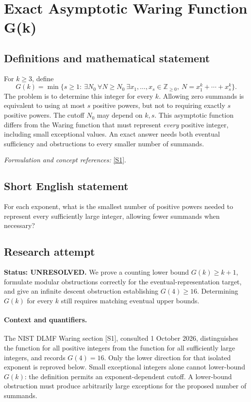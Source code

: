 \documentclass[11pt]{article}
\begin{document}
\section*{\texorpdfstring{Exact Asymptotic Waring Function G(k)}{Exact Asymptotic Waring Function G(k)}}\label{statement}
\subsection{Definitions and mathematical statement}
For $k\ge3$, define
\[
 G(k)=\min\{s\ge1:\ \exists N_0\ \forall N\ge N_0\
 \exists x_1,\ldots,x_s\in{\mathbb{Z}}_{\ge0},\ N=x_1^k+\cdots+x_s^k\}.
\]
The problem is to determine this integer for every $k$. Allowing zero summands is equivalent to using at most $s$ positive powers, but not to requiring exactly $s$ positive powers. The cutoff $N_0$ may depend on $k,s$. This asymptotic function differs from the Waring function that must represent \emph{every} positive integer, including small exceptional values. An exact answer needs both eventual sufficiency and obstructions to every smaller number of summands.
\par\smallskip\textit{Formulation and concept references:} \href{https://dlmf.nist.gov/27.13}{[S1]}.

\subsection{Short English statement}
For each exponent, what is the smallest number of positive powers needed to represent every sufficiently large integer, allowing fewer summands when necessary?
\subsection{Research attempt}
\textbf{Status: UNRESOLVED.} We prove a counting lower bound $G(k)\ge k+1$, formulate modular obstructions correctly for the eventual-representation target, and give an infinite descent obstruction establishing $G(4)\ge16$. Determining $G(k)$ for every $k$ still requires matching eventual upper bounds.

\paragraph{Context and quantifiers.}
The NIST DLMF Waring section [S1], consulted 1 October 2026, distinguishes the function for all positive integers from the function for all sufficiently large integers, and records $G(4)=16$. Only the lower direction for that isolated exponent is reproved below. Small exceptional integers alone cannot lower-bound $G(k)$: the definition permits an exponent-dependent cutoff. A lower-bound obstruction must produce arbitrarily large exceptions for the proposed number of summands.
\end{document}
